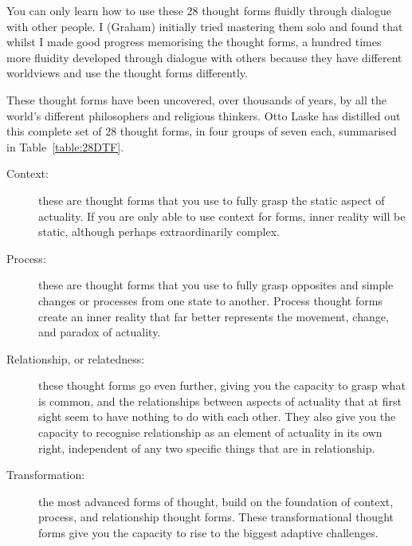 You can only learn how to use these 28 thought forms fluidly through dialogue with other people. I (Graham) initially tried mastering them solo and found that whilst I made good progress memorising the thought forms, a hundred times more fluidity developed through dialogue with others because they have different worldviews and use the thought forms differently.


These thought forms have been uncovered, over thousands of years, by all the world's different philosophers and religious thinkers. Otto Laske has distilled out this complete set of 28 thought forms, in four groups of seven each, summarised in Table~\ref{table:28DTF}.


\begin{description}
\item[Context:] these are thought forms that you use to fully grasp the static aspect of actuality. If you are only able to use context for forms, inner reality will be static, although perhaps extraordinarily complex.
\item[Process:] these are thought forms that you use to fully grasp opposites and simple changes or processes from one state to another. Process thought forms create an inner reality that far better represents the movement, change, and paradox of actuality.
\item[Relationship, or relatedness:] these thought forms go even further, giving you the capacity to grasp what is common, and the relationships between aspects of actuality that at first sight seem to have nothing to do with each other. They also give you the capacity to recognise relationship as an element of actuality in its own right, independent of any two specific things that are in relationship.
\item[Transformation:] the most advanced forms of thought, build on the foundation of context, process, and relationship thought forms. These transformational thought forms give you the capacity to rise to the biggest adaptive challenges.
\end{description}



